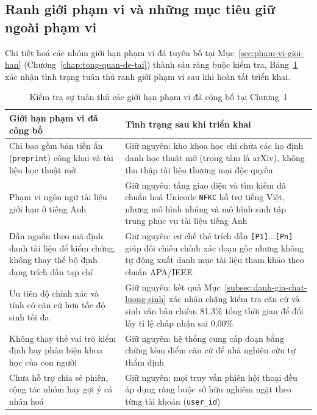 \subsection{Ranh giới phạm vi và những mục tiêu giữ ngoài phạm vi}
\label{subsec:ranh-gioi-pham-vi}

Chi tiết hoá các nhóm giới hạn phạm vi đã tuyên bố tại Mục~\ref{sec:pham-vi-gioi-han} (Chương~\ref{chap:tong-quan-de-tai}) thành sáu ràng buộc kiểm tra, Bảng~\ref{tab:kiem-tra-gioi-han-pham-vi} xác nhận tình trạng tuân thủ ranh giới phạm vi sau khi hoàn tất triển khai.

\begin{table}[htbp]
\centering
\caption{Kiểm tra sự tuân thủ các giới hạn phạm vi đã công bố tại Chương~1}
\label{tab:kiem-tra-gioi-han-pham-vi}
\small
\begin{tabularx}{\textwidth}{
  >{\raggedright\arraybackslash}p{5.5cm}
  >{\raggedright\arraybackslash}X
}
\toprule
\textbf{Giới hạn phạm vi đã công bố} & \textbf{Tình trạng sau khi triển khai} \\
\midrule
Chỉ bao gồm bản tiền ấn (\texttt{preprint}) công khai và tài liệu học thuật mở & Giữ nguyên: kho khoa học chỉ chứa các họ định danh học thuật mở (trọng tâm là arXiv), không thu thập tài liệu thương mại độc quyền \\
\midrule
Phạm vi ngôn ngữ tài liệu giới hạn ở tiếng Anh & Giữ nguyên: tầng giao diện và tìm kiếm đã chuẩn hoá Unicode \texttt{NFKC} hỗ trợ tiếng Việt, nhưng mô hình nhúng và mô hình sinh tập trung phục vụ tài liệu tiếng Anh \\
\midrule
Dẫn nguồn theo mã định danh tài liệu để kiểm chứng, không thay thế bộ định dạng trích dẫn tạp chí & Giữ nguyên: cơ chế thẻ trích dẫn \texttt{[P1]}...\texttt{[Pn]} giúp đối chiếu chính xác đoạn gốc nhưng không tự động xuất danh mục tài liệu tham khảo theo chuẩn APA/IEEE \\
\midrule
Ưu tiên độ chính xác và tính có căn cứ hơn tốc độ sinh tối đa & Giữ nguyên: kết quả Mục~\ref{subsec:danh-gia-chat-luong-sinh} xác nhận chặng kiểm tra căn cứ và sinh văn bản chiếm 81,3\% tổng thời gian để đổi lấy tỉ lệ chấp nhận sai 0,00\% \\
\midrule
Không thay thế vai trò kiểm định hay phản biện khoa học của con người & Giữ nguyên: hệ thống cung cấp đoạn bằng chứng kèm điểm căn cứ để nhà nghiên cứu tự thẩm định \\
\midrule
Chưa hỗ trợ chia sẻ phiên, cộng tác nhóm hay gợi ý cá nhân hoá & Giữ nguyên: mọi truy vấn phiên hội thoại đều áp dụng ràng buộc sở hữu nghiêm ngặt theo từng tài khoản (\texttt{user\_id}) \\
\bottomrule
\end{tabularx}
\end{table}

